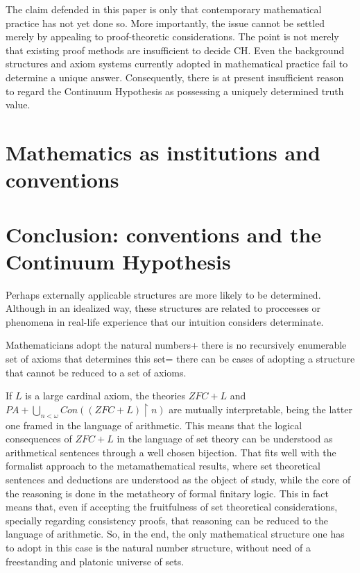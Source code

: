 \documentclass[11pt,a4paper]{book}
\theoremstyle{plain}
\begin{document}
The claim defended in this paper is only that contemporary mathematical practice has not yet done so. More importantly, the issue cannot be settled merely by appealing to proof-theoretic considerations. The point is not merely that existing proof methods are insufficient to decide CH. Even the background structures and axiom systems currently adopted in mathematical practice fail to determine a unique answer. Consequently, there is at present insufficient reason to regard the Continuum Hypothesis as possessing a uniquely determined truth value.


\chapter{Mathematics as institutions and conventions}
\label{chapter3}

\chapter{Conclusion: conventions and the Continuum Hypothesis}

Perhaps externally applicable structures are more likely to be determined. Although in an idealized way, these structures are related to proccesses or phenomena in real-life experience that our intuition considers determinate. 

Mathematicians adopt the natural numbers+ there is no recursively enumerable set of axioms that determines this set= there can be cases of adopting a structure that cannot be reduced to a set of axioms.

If $L$ is a large cardinal axiom, the theories $ZFC+L$ and $PA + \bigcup_{n < \omega} Con((ZFC + L)\upharpoonright n)$ are mutually interpretable, being the latter one framed in the language of arithmetic. This means that the logical consequences of $ZFC + L$ in the language of set theory can be understood as arithmetical sentences through a well chosen bijection. That fits well with the formalist approach to the metamathematical results, where set theoretical sentences and deductions are understood as the object of study, while the core of the reasoning is done in the metatheory of formal finitary logic. This in fact means that, even if accepting the fruitfulness of set theoretical considerations, specially regarding consistency proofs, that reasoning can be reduced to the language of arithmetic. So, in the end, the only mathematical structure one has to adopt in this case is the natural number structure, without need of a freestanding and platonic universe of sets.
\end{document}
